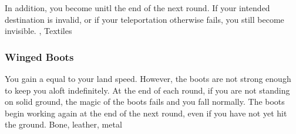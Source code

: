 In addition, you become  unitl the end of the next round.
If your intended destination is invalid, or if your teleportation otherwise fails, you still become invisible.
 , 
 Textiles
\lowercase{\hypertarget{item:Winged Boots}{}}\label{item:Winged Boots}
\hypertarget{item:Winged Boots}{\subsubsection{Winged Boots\hfill{}}}
You gain a  equal to your land speed.
However, the boots are not strong enough to keep you aloft indefinitely.
At the end of each round, if you are not standing on solid ground, the magic of the boots fails and you fall normally.
The boots begin working again at the end of the next round, even if you have not yet hit the ground.
 
 Bone, leather, metal